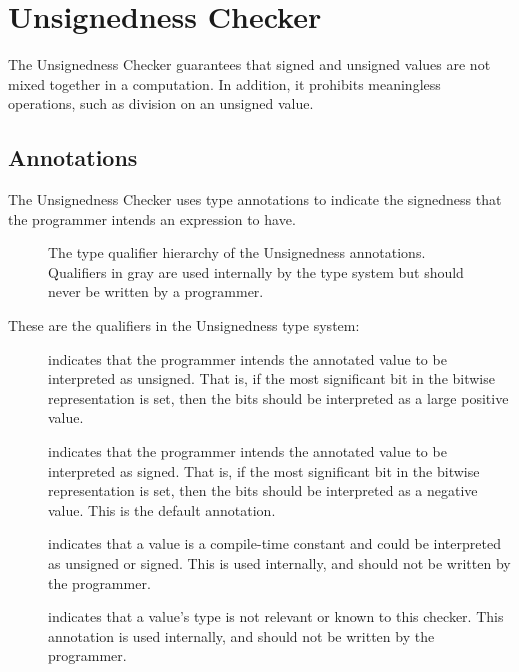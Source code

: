 \htmlhr
\chapter{Unsignedness Checker\label{unsignedness-checker}}

The Unsignedness Checker guarantees that signed and unsigned values are not mixed
together in a computation. In addition, it prohibits meaningless operations, such
as division on an unsigned value.

\section{Annotations\label{unsignedness-checker-annotations}}

The Unsignedness Checker uses type annotations to indicate the signedness that the programmer intends an expression to have.

\begin{figure}
\caption{The type qualifier hierarchy of the Unsignedness annotations.
Qualifiers in gray are used internally by the type system but should never be written by a programmer.}
\label{fig-unsignedness-hierarchy}
\end{figure}

These are the qualifiers in the Unsignedness type system:

\begin{description}

\item[]
    indicates that the programmer intends the annotated value to be
    interpreted as unsigned.
    That is, if the most significant bit in the bitwise representation is
    set, then the bits should be interpreted as a large positive value.

\item[]
    indicates that the programmer intends the annotated value to be
    interpreted as signed.
    That is, if the most significant bit in the bitwise representation is
    set, then the bits should be interpreted as a negative value.
    This is the default annotation.

\item[]
    indicates that a value is a compile-time constant and could be
    interpreted as unsigned or signed. This is used internally, and should not
    be written by the programmer.

\item[]
    indicates that a value's type is not relevant or known to this checker.
    This annotation is used internally, and should not be
    written by the programmer.

\end{description}


